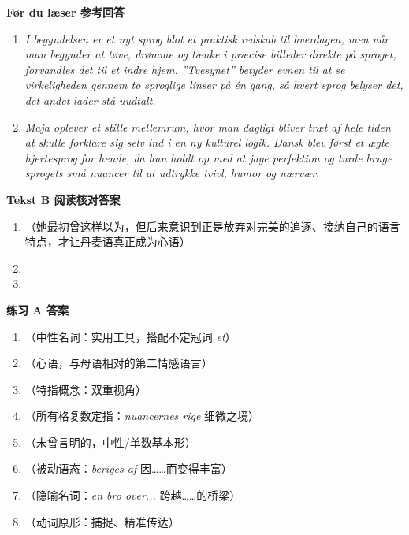 \begin{answerbox}
\textbf{Før du læser 参考回答}
\begin{enumerate}
  \item \textit{I begyndelsen er et nyt sprog blot et praktisk redskab til hverdagen, men når man begynder at tøve, drømme og tænke i præcise billeder direkte på sproget, forvandles det til et indre hjem. ”Tvesynet” betyder evnen til at se virkeligheden gennem to sproglige linser på én gang, så hvert sprog belyser det, det andet lader stå uudtalt.}
  \item \textit{Maja oplever et stille mellemrum, hvor man dagligt bliver træt af hele tiden at skulle forklare sig selv ind i en ny kulturel logik. Dansk blev først et ægte hjertesprog for hende, da hun holdt op med at jage perfektion og turde bruge sprogets små nuancer til at udtrykke tvivl, humor og nærvær.}
\end{enumerate}

\textbf{Tekst B 阅读核对答案}
\begin{enumerate}
  \item {}（她最初曾这样以为，但后来意识到正是放弃对完美的追逐、接纳自己的语言特点，才让丹麦语真正成为心语）
  \item {}
  \item {}
\end{enumerate}

\textbf{练习 A 答案}
\begin{enumerate}
  \item {}（中性名词：实用工具，搭配不定冠词 \textit{et}）
  \item {}（心语，与母语相对的第二情感语言）
  \item {}（特指概念：双重视角）
  \item {}（所有格复数定指：\textit{nuancernes rige} 细微之境）
  \item {}（未曾言明的，中性/单数基本形）
  \item {}（被动语态：\textit{beriges af} 因……而变得丰富）
  \item {}（隐喻名词：\textit{en bro over...} 跨越……的桥梁）
  \item {}（动词原形：捕捉、精准传达）
\end{enumerate}


\end{answerbox}
